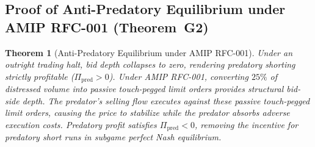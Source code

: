 \documentclass[11pt,a4paper]{article}
\newtheorem{theorem}{Theorem}[section]
\theoremstyle{definition}\newtheorem{definition}[theorem]{Definition}
\theoremstyle{remark}\newtheorem{remark}[theorem]{Remark}
\begin{document}
\subsection{Proof of Anti-Predatory Equilibrium under AMIP RFC-001 (Theorem~G2)}
\label{sec:supp_proof_g2}
\begin{theorem}[Anti-Predatory Equilibrium under AMIP RFC-001]\label{thm:supp_g2}
Under an outright trading halt, bid depth collapses to zero, rendering predatory shorting strictly profitable ($\Pi_{\text{pred}} > 0$). Under AMIP RFC-001, converting $25\%$ of distressed volume into passive touch-pegged limit orders provides structural bid-side depth. The predator's selling flow executes against these passive touch-pegged limit orders, causing the price to stabilize while the predator absorbs adverse execution costs. Predatory profit satisfies $\Pi_{\text{pred}} < 0$, removing the incentive for predatory short runs in subgame perfect Nash equilibrium.
\end{theorem}
\end{document}
